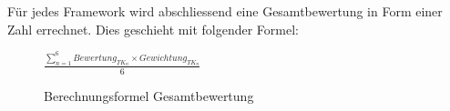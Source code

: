 Für jedes Framework wird abschliessend eine Gesamtbewertung in Form einer Zahl errechnet. Dies geschieht mit folgender Formel:

\begin{figure}[H]
	\centering
	\large
	\begin{math}
		\frac{\sum \limits_{n=1}^6 Bewertung_{TK_n} \times {Gewichtung_{TK_n}}}{6}
	\end{math}
	\caption{Berechnungsformel Gesamtbewertung}
\end{figure}


\newpage






